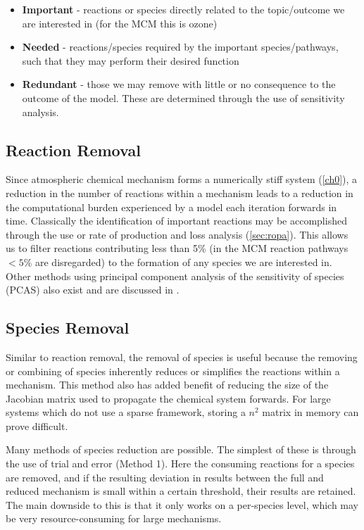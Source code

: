 \begin{itemize}
    \item \textbf{Important} - reactions or species directly related to the topic/outcome we are interested in (for the MCM this is ozone)
    \item \textbf{Needed} - reactions/species required by the important species/pathways, such that they may perform their desired function
    \item \textbf{Redundant} - those we may remove with little or no consequence to the outcome of the model. These are determined through the use of sensitivity analysis.
\end{itemize}



\subsection{Reaction Removal}
Since atmospheric chemical mechanism forms a numerically stiff system (\autoref{ch0}), a reduction in the number of reactions within a mechanism leads to a reduction in the computational burden experienced by a model each iteration forwards in time. Classically the identification of important reactions may be accomplished through the use or rate of production and loss analysis (\autoref{sec:ropa}). This allows us to filter reactions contributing less than 5\% (in the MCM reaction pathways $<5\%$ are disregarded) to the formation of any species we are interested in. Other methods using principal component analysis of the sensitivity of species (PCAS) also exist and are discussed in \citep{PCAS,wyche}.


\subsection{Species Removal}
Similar to reaction removal, the removal of species is useful because the removing or combining of species inherently reduces or simplifies the reactions within a mechanism.  This method also has added benefit of reducing the size of the Jacobian matrix used to propagate the chemical system forwards. For large systems which do not use a sparse framework, storing a $n^2$ matrix in memory can prove difficult.

Many methods of species reduction are possible. The simplest of these is through the use of trial and error \citep{tur1990} (Method 1). Here the consuming reactions for a species are removed, and if the resulting deviation in results between the full and reduced mechanism is small within a certain threshold, their results are retained. The main downside to this is that it only works on a per-species level, which may be very resource-consuming for large mechanisms.

